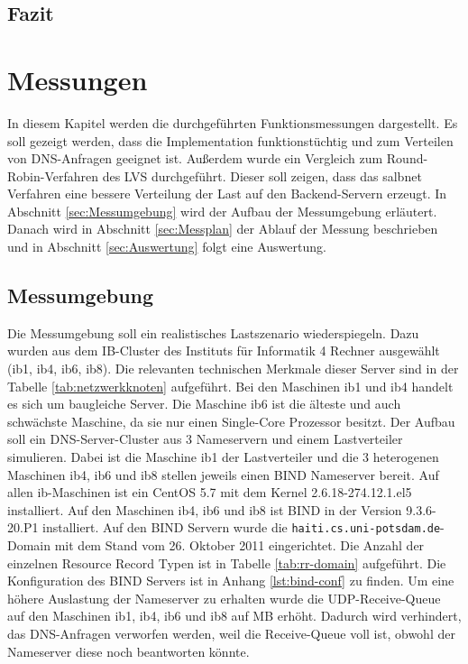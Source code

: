 \documentclass[a4paper, 12pt, BCOR10mm, DIV12, toc=bibliography, toc=listof, german]{scrbook}
\begin{document}

		\section{Fazit} %
		\label{sec:implementierung-fazit}
		


	\chapter{Messungen} %
	\label{cha:messungen}

		In diesem Kapitel werden die durchgeführten Funktionsmessungen dargestellt. Es soll gezeigt
		werden, dass die Implementation funktionstüchtig und zum Verteilen von DNS-Anfragen geeignet
		ist. Außerdem wurde ein Vergleich zum Round-Robin-Verfahren des LVS durchgeführt. Dieser soll
		zeigen, dass das salbnet Verfahren eine bessere Verteilung der Last auf den Backend-Servern
		erzeugt. In Abschnitt \ref{sec:Messumgebung} wird der Aufbau der Messumgebung erläutert. Danach
		wird in Abschnitt \ref{sec:Messplan} der Ablauf der Messung beschrieben und in Abschnitt
		\ref{sec:Auswertung} folgt eine Auswertung.

		\section{Messumgebung} %
		\label{sec:messumgebung}
	
		Die Messumgebung soll ein realistisches Lastszenario wiederspiegeln. Dazu wurden aus dem
		IB-Cluster des Instituts für Informatik 4 Rechner ausgewählt (ib1, ib4, ib6, ib8). Die
		relevanten technischen Merkmale dieser Server sind in der Tabelle \ref{tab:netzwerkknoten}
		aufgeführt. Bei den	Maschinen ib1 und ib4 handelt es sich um baugleiche Server. Die Maschine ib6
		ist die älteste und auch schwächste Maschine, da sie nur einen Single-Core Prozessor besitzt.
		Der Aufbau soll ein DNS-Server-Cluster aus 3 Nameservern und einem Lastverteiler simulieren.
		Dabei ist die Maschine ib1 der Lastverteiler und die 3 heterogenen Maschinen ib4, ib6 und ib8
		stellen jeweils einen BIND Nameserver bereit.	Auf allen ib-Maschinen ist ein CentOS 5.7 mit dem
		Kernel 2.6.18-274.12.1.el5 installiert.  Auf den Maschinen ib4, ib6 und ib8 ist BIND in der
		Version 9.3.6-20.P1 installiert. Auf den BIND Servern wurde die
		\texttt{haiti.cs.uni-potsdam.de}-Domain mit dem Stand vom 26. Oktober 2011 eingerichtet. Die
		Anzahl der einzelnen Resource Record Typen ist in Tabelle \ref{tab:rr-domain} aufgeführt. Die
		Konfiguration des BIND Servers ist in Anhang \ref{lst:bind-conf} zu finden. Um eine höhere
		Auslastung der Nameserver zu erhalten wurde die UDP-Receive-Queue auf den Maschinen ib1, ib4,
		ib6 und ib8 auf \unit[24]{MB} erhöht. Dadurch wird verhindert, das DNS-Anfragen verworfen
		werden, weil die Receive-Queue voll ist, obwohl der Nameserver diese noch beantworten könnte.
		
\end{document}
